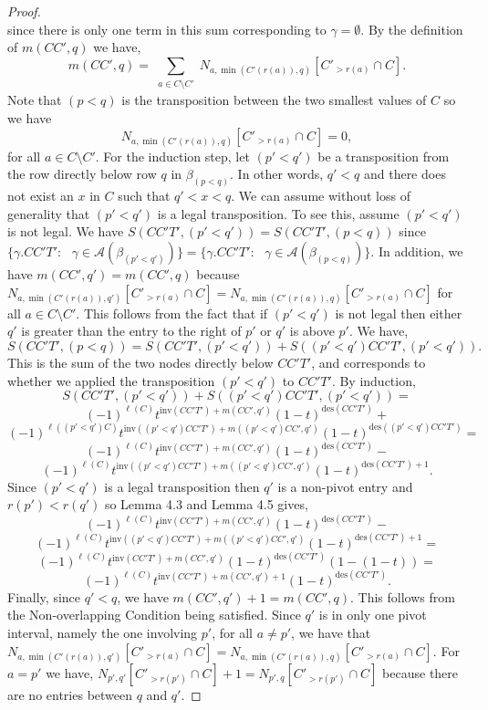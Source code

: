 \documentclass[11pt]{amsart}
\begin{document}
{\begin{proof}
\[\]
since there is only one term in this sum corresponding to $\gamma=\emptyset$. By the definition of $m(CC',q)$ we have,
\[
m(CC',q)=\sum_{\substack{a\in C\setminus C'}}N_{a,\min(C'(r(a)),q)}[C'_{>r(a)}\cap C].
\]
Note that $(p<q)$ is the transposition between the two smallest values of $C$ so we have
\[
N_{a,\min(C'(r(a)),q)}[C'_{>r(a)}\cap C]=0,
\]
for all $a \in C\setminus C'$.
\newline\indent For the induction step, let $(p'<q')$ be a transposition from the row directly below row $q$ in $\beta_{(p<q)}$. In other words, $q'<q$ and there does not exist an $x$ in $C$ such that $q'<x<q$. We can assume without loss of generality that $(p'<q')$ is a legal transposition. To see this, assume $(p'<q')$ is not legal. We have $S(CC'T',(p'<q'))=S(CC'T',(p<q))$ since $\{\gamma.CC'T':\text{ } \gamma\in\mathcal{A}(\beta_{(p'<q')})\}=\{\gamma.CC'T':\text{ } \gamma\in\mathcal{A}(\beta_{(p<q)})\}$. In addition, we have $m(CC',q')=m(CC',q)$ because $N_{a,\min(C'(r(a)),q')}[C'_{>r(a)}\cap C]=N_{a,\min(C'(r(a)),q)}[C'_{>r(a)}\cap C]$ for all $a\in C\setminus C'$. This follows from the fact that if $(p'<q')$ is not legal then either $q'$ is greater than the entry to the right of $p'$ or $q'$ is above $p'$. 
\newline\indent We have, 
\[
S(CC'T',(p<q))=S(CC'T',(p'<q'))+S((p'<q')CC'T',(p'<q')).
\]
This is the sum of the two nodes directly below $CC'T'$, and corresponds to whether we applied the transposition $(p'<q')$ to $CC'T'$. 
By induction, 
\[
S(CC'T',(p'<q'))+S((p'<q')CC'T',(p'<q'))=
\]
\[
(-1)^{\ell(C)}t^{\text{inv} ( CC'T')+m(CC',q')}(1-t)^{\text{des}(CC' T')}+
\]
\[
(-1)^{\ell((p'<q')C)}t^{\text{inv} ( (p'<q')CC'T')+m((p'<q')CC',q')}(1-t)^{\text{des}((p'<q')CC' T')}=
\]
\[
(-1)^{\ell(C)}t^{\text{inv} ( CC'T')+m(CC',q')}(1-t)^{\text{des}(CC' T')}-
\]
\[
(-1)^{\ell(C)}t^{\text{inv} ( (p'<q')CC'T')+m((p'<q')CC',q')}(1-t)^{\text{des}(CC' T')+1}.
\]
Since $(p'<q')$ is a legal transposition then $q'$ is a non-pivot entry and $r(p')<r(q')$ so Lemma 4.3 and Lemma 4.5 gives, 
\[
(-1)^{\ell(C)}t^{\text{inv} ( CC'T')+m(CC',q')}(1-t)^{\text{des}(CC' T')}-
\]
\[
(-1)^{\ell(C)}t^{\text{inv} ( (p'<q')CC'T')+m((p'<q')CC',q')}(1-t)^{\text{des}(CC' T')+1}=
\]
\[
(-1)^{\ell(C)}t^{\text{inv} ( CC'T')+m(CC',q')}(1-t)^{\text{des}(CC' T')}(1-(1-t))=
\]
\[
(-1)^{\ell(C)}t^{\text{inv} ( CC'T')+m(CC',q')+1}(1-t)^{\text{des}(CC' T')}.
\]
Finally, since $q'<q$, we have $m(CC',q')+1=m(CC',q)$. This follows from the Non-overlapping Condition being satisfied. Since $q'$ is in only one pivot interval, namely the one involving $p'$, for all $a\neq p'$, we have that $N_{a,\min(C'(r(a)),q')}[C'_{>r(a)}\cap C]=N_{a,\min(C'(r(a)),q)}[C'_{>r(a)}\cap C]$. For $a=p'$ we have, $N_{p',q'}[C'_{>r(p')}\cap C]+1=N_{p',q}[C'_{>r(p')}\cap C]$ because there are no entries between $q$ and $q'$.

\end{proof}}
\end{document}
